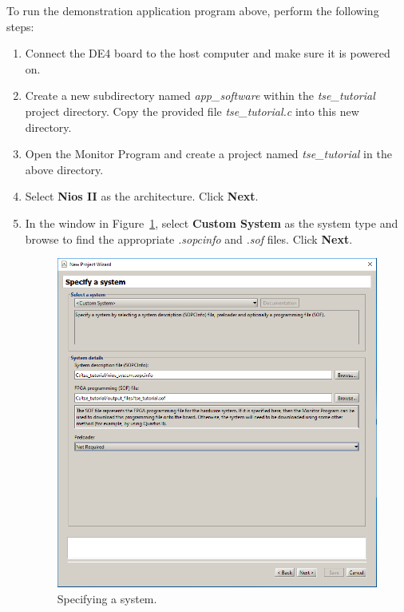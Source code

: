 \documentclass[11pt, twoside, pdftex]{article}
\begin{document}
To run the demonstration application program above, perform the following steps:

\begin{enumerate}
	\item Connect the DE4 board to the host computer and make sure it is powered on.
	
	\item Create a new subdirectory named {\it app\_software} within the {\it tse\_tutorial} project directory. Copy the provided file {\it tse\_tutorial.c} into this new directory. 
	
	\item Open the Monitor Program and create a project named {\it tse\_tutorial} in the above directory.
	
	\item Select {\bf Nios II} as the architecture. Click {\bf Next}. 
	
	\item In the window in Figure~\ref{fig:monitor_figure1}, select {\bf Custom System} as the system type and browse to find the appropriate {\it .sopcinfo} and {\it .sof} files. Click {\bf Next}.
	
	\begin{figure}[H]
		\centering
		  \includegraphics[scale=0.55]{figures/monitor_figure1.png}
		\caption{Specifying a system.} 
		\label{fig:monitor_figure1}
	\end{figure}	
	

\end{enumerate}
\end{document}
